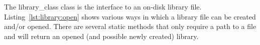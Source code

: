 The \gls{library_class} class is the interface to an on-disk library file. Listing~\ref{lst:library:open} shows various ways in which a library file can be created and/or opened. There are several static methods that only require a path to a file and will return an opened (and possible newly created) library.


